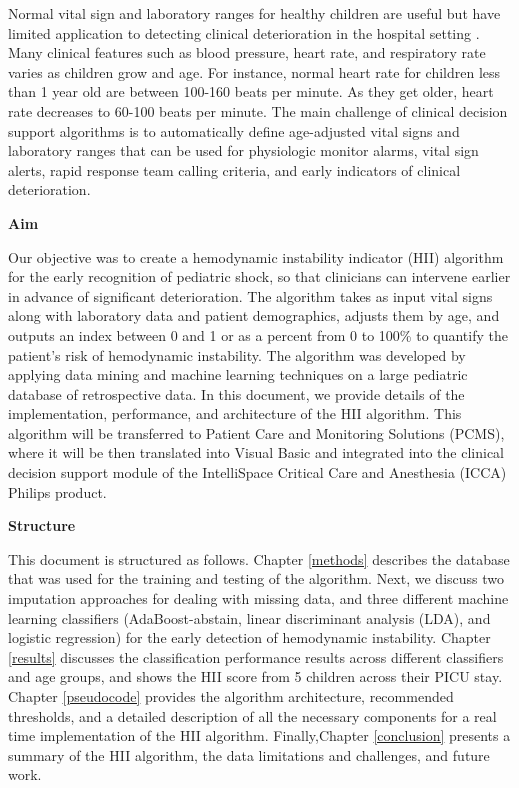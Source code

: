 \documentclass[
   technote
]{phildoc}
\newcommand{\hii}{HII}
\begin{document}
Normal vital sign and laboratory ranges for healthy children are useful but have limited application to detecting clinical deterioration in the hospital setting \citep{Bonafide:2013}. Many clinical features such as blood pressure, heart rate, and respiratory rate varies as children grow and age. For instance, normal heart rate for children less than 1 year old are between 100-160 beats per minute. As they get older, heart rate decreases to 60-100 beats per minute. The main challenge of clinical decision support algorithms is to automatically define age-adjusted vital signs and laboratory ranges that can be used for physiologic monitor alarms, vital sign alerts, rapid response team calling criteria, and early indicators of clinical deterioration. 

\noindent\textbf{Aim}

Our objective was to create a hemodynamic instability indicator (\hii{}) algorithm for the early recognition of pediatric shock, so that clinicians can intervene earlier in advance of significant deterioration. The algorithm takes as input vital signs along with laboratory data and patient demographics, adjusts them by age, and outputs an index between 0 and 1 or as a percent from 0 to 100\% to quantify the patient's risk of hemodynamic instability. The algorithm was developed by applying data mining and machine learning techniques on a large pediatric database of retrospective data. In this document, we provide details of the implementation, performance, and architecture of the \hii{} algorithm. This algorithm will be transferred to Patient Care and Monitoring Solutions (PCMS), where it will be then translated into Visual Basic and integrated into the clinical decision support module of the IntelliSpace Critical Care and Anesthesia (ICCA) Philips product. 

\noindent\textbf{Structure}

This document is structured as follows. Chapter \ref{methods} describes the database that was used for the training and testing of the algorithm. Next, we discuss two imputation approaches for dealing with missing data, and three different machine learning classifiers (AdaBoost-abstain, linear discriminant analysis (LDA), and logistic regression) for the early detection of hemodynamic instability. Chapter \ref{results} discusses the classification performance results across different classifiers and age groups, and shows the \hii{} score from 5 children across their PICU stay. Chapter \ref{pseudocode} provides the algorithm architecture, recommended thresholds, and a detailed description of all the necessary components for a real time implementation of the \hii{} algorithm. Finally,Chapter \ref{conclusion} presents a summary of the \hii{} algorithm, the data limitations and challenges, and future work.        
\end{document}
